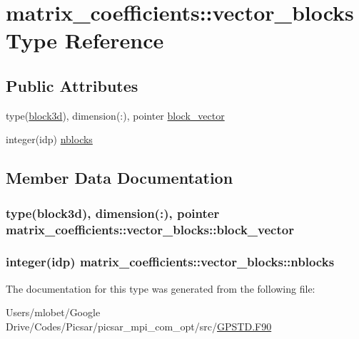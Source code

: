 \hypertarget{structmatrix__coefficients_1_1vector__blocks}{}\section{matrix\+\_\+coefficients\+:\+:vector\+\_\+blocks Type Reference}
\label{structmatrix__coefficients_1_1vector__blocks}
\subsection*{Public Attributes}
\begin{DoxyCompactItemize}
\item 
type(\hyperlink{structmatrix__coefficients_1_1block3d}{block3d}), dimension(\+:), pointer \hyperlink{structmatrix__coefficients_1_1vector__blocks_a1f0623f2a51cde2b09b4e81f3fb28315}{block\+\_\+vector}
\item 
integer(idp) \hyperlink{structmatrix__coefficients_1_1vector__blocks_ae6e50191ac38e727134df39210056997}{nblocks}
\end{DoxyCompactItemize}


\subsection{Member Data Documentation}
\subsubsection[{\texorpdfstring{block\+\_\+vector}{block_vector}}]{\setlength{\rightskip}{0pt plus 5cm}type({\bf block3d}), dimension(\+:), pointer matrix\+\_\+coefficients\+::vector\+\_\+blocks\+::block\+\_\+vector}\hypertarget{structmatrix__coefficients_1_1vector__blocks_a1f0623f2a51cde2b09b4e81f3fb28315}{}\label{structmatrix__coefficients_1_1vector__blocks_a1f0623f2a51cde2b09b4e81f3fb28315}
\subsubsection[{\texorpdfstring{nblocks}{nblocks}}]{\setlength{\rightskip}{0pt plus 5cm}integer(idp) matrix\+\_\+coefficients\+::vector\+\_\+blocks\+::nblocks}\hypertarget{structmatrix__coefficients_1_1vector__blocks_ae6e50191ac38e727134df39210056997}{}\label{structmatrix__coefficients_1_1vector__blocks_ae6e50191ac38e727134df39210056997}


The documentation for this type was generated from the following file\+:\begin{DoxyCompactItemize}
\item 
Users/mlobet/\+Google Drive/\+Codes/\+Picsar/picsar\+\_\+mpi\+\_\+com\+\_\+opt/src/\hyperlink{_g_p_s_t_d_8_f90}{G\+P\+S\+T\+D.\+F90}\end{DoxyCompactItemize}
